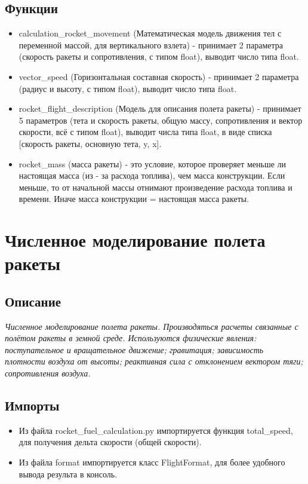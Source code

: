 \documentclass[a4paper, 12pt]{report}
\begin{document}
\section{Функции}
\begin{itemize}
    \item calculation\_rocket\_movement (Математическая модель движения тел с переменной массой, для вертикального взлета) - принимает 2 параметра (скорость ракеты и сопротивления, с типом float), выводит число типа float.
    \item vector\_speed (Горизонтальная составная скорость) - принимает 2 параметра (радиус и высоту, с типом float), выводит число типа float.
    \item rocket\_flight\_description (Модель для описания полета ракеты) - принимает 5 параметров (тета и скорость ракеты, общую массу, сопротивления и вектор скорости, всё с типом float), выводит числа типа float, в виде списка [скорость ракеты, основную тета, y, x].
    \item rocket\_mass (масса ракеты) - это условие, которое проверяет меньше ли настоящая масса (из - за расхода топлива), чем масса конструкции. Если меньше, то от начальной массы отнимают произведение расхода топлива и времени. Иначе масса конструкции = настоящая масса ракеты.
\end{itemize}
\clearpage

\chapter{Численное моделирование полета ракеты}
\section{Описание}
\textit{Численное моделирование полета ракеты. Производяться расчеты связанные с полётом ракеты в земной среде. Используются физические явления: поступательное и вращательное движение; гравитация; зависимость плотности воздуха от высоты; реактивная сила с отклонением вектором тяги; сопротивления воздуха.}
\section{Импорты}
\begin{itemize}
    \item Из файла rocket\_fuel\_calculation.py импортируется функция total\_speed, для получения дельта скорости (общей скорости).
    \item Из файла format импортируется класс FlightFormat, для более удобного вывода результа в консоль.
\end{itemize}
\end{document}
